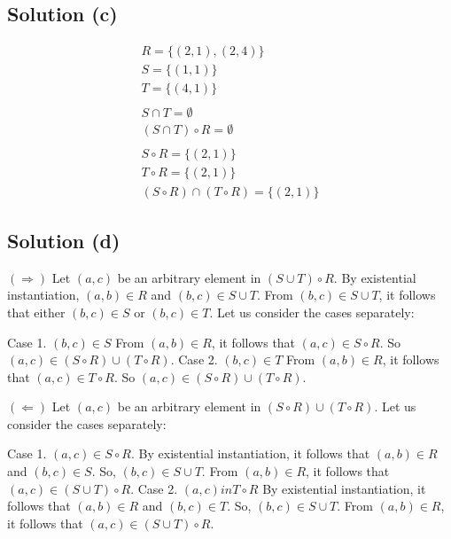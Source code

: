 \documentclass{article}
\begin{document}
\subsection{Solution (c)}
\begin{align*}
R = \{(2,1),(2,4)\} \\
S = \{(1,1)\} \\
T = \{(4,1)\} \\ \\
S \cap T = \emptyset \\
(S \cap T) \circ R = \emptyset \\ \\
S \circ R = \{(2,1)\} \\
T \circ R = \{(2,1)\} \\
(S \circ R) \cap (T \circ R) = \{(2,1)\}
\end{align*}

\subsection{Solution (d)}

$(\Rightarrow)$ Let $(a,c)$ be an arbitrary element in $(S \cup T)
\circ R$. By existential instantiation, $(a,b) \in R$ and $(b,c) \in S
\cup T$. From $(b,c) \in S \cup T$, it follows that either $(b,c) \in
S$ or $(b,c) \in T$. Let us consider the cases separately:

Case 1. $(b,c) \in S$ From $(a,b) \in R$, it follows that $(a,c) \in S
\circ R$. So $(a,c) \in (S \circ R) \cup (T \circ R)$.
Case 2. $(b,c) \in T$ From $(a,b) \in R$, it follows that $(a,c) \in T
\circ R$. So $(a,c) \in (S \circ R) \cup (T \circ R)$.

$(\Leftarrow)$ Let $(a,c)$ be an arbitrary element in $(S \circ R)
\cup (T \circ R)$. Let us consider the cases separately:

Case 1. $(a,c) \in S \circ R$. By existential instantiation, it
follows that $(a,b) \in R$ and $(b,c) \in S$. So, $(b,c) \in S \cup
T$. From $(a,b) \in R$, it follows that $(a,c) \in (S \cup T) \circ R$.
Case 2. $(a,c) in T \circ R$ By existential instantiation, it follows
that $(a,b) \in R$ and $(b,c) \in T$. So, $(b,c) \in S \cup T$. From
$(a,b) \in R$, it follows that $(a,c) \in (S \cup T) \circ R$.
\end{document}

